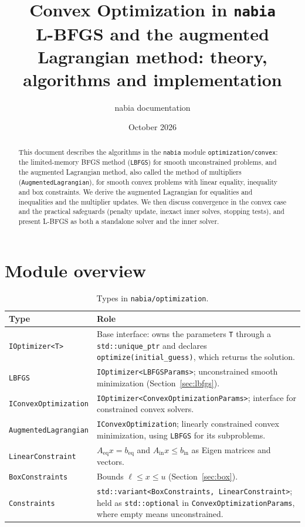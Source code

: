 \documentclass[11pt,a4paper]{article}
\title{Convex Optimization in \texttt{nabia}\\[0.3em]\large L-BFGS and the augmented Lagrangian method: theory, algorithms and implementation}
\author{nabia documentation}
\date{October 2026}
\newcommand{\Aeq}{A_{\mathrm{eq}}}
\newcommand{\beq}{b_{\mathrm{eq}}}
\newcommand{\Ain}{A_{\mathrm{in}}}
\newcommand{\bin}{b_{\mathrm{in}}}
\begin{document}
\maketitle

\begin{abstract}
This document describes the algorithms in the \texttt{nabia} module
\texttt{optimization/convex}: the limited-memory BFGS method (\texttt{LBFGS})
for smooth unconstrained problems, and the augmented Lagrangian method, also called the
method of multipliers (\texttt{AugmentedLagrangian}), for smooth convex
problems with linear equality, inequality and box constraints. We derive the
augmented Lagrangian for equalities and inequalities and the multiplier updates. We then
discuss convergence in the convex case and the practical safeguards (penalty update,
inexact inner solves, stopping tests), and present L-BFGS as both a standalone
solver and the inner solver.
\end{abstract}

\tableofcontents

\section{Module overview}

\begin{table}[ht]
\centering
\begin{tabular}{@{}l>{\raggedright\arraybackslash}p{9.5cm}@{}}
\toprule
Type & Role \\
\midrule
\texttt{IOptimizer<T>} & Base interface: owns the parameters \texttt{T} through a \texttt{std::unique\_ptr} and declares \texttt{optimize(initial\_guess)}, which returns the solution. \\
\texttt{LBFGS} & \texttt{IOptimizer<LBFGSParams>}; unconstrained smooth minimization (Section~\ref{sec:lbfgs}). \\
\texttt{IConvexOptimization} & \texttt{IOptimizer<ConvexOptimizationParams>}; interface for constrained convex solvers. \\
\texttt{AugmentedLagrangian} & \texttt{IConvexOptimization}; linearly constrained convex minimization, using \texttt{LBFGS} for its subproblems. \\
\texttt{LinearConstraint} & $\Aeq x=\beq$ and $\Ain x\le\bin$ as Eigen matrices and vectors. \\
\texttt{BoxConstraints} & Bounds $\ell\le x\le u$ (Section~\ref{sec:box}). \\
\texttt{Constraints} & \texttt{std::variant<BoxConstraints, LinearConstraint>}; held as \texttt{std::optional} in \texttt{ConvexOptimizationParams}, where empty means unconstrained. \\
\bottomrule
\end{tabular}
\caption{Types in \texttt{nabia/optimization}.}
\end{table}
\end{document}
